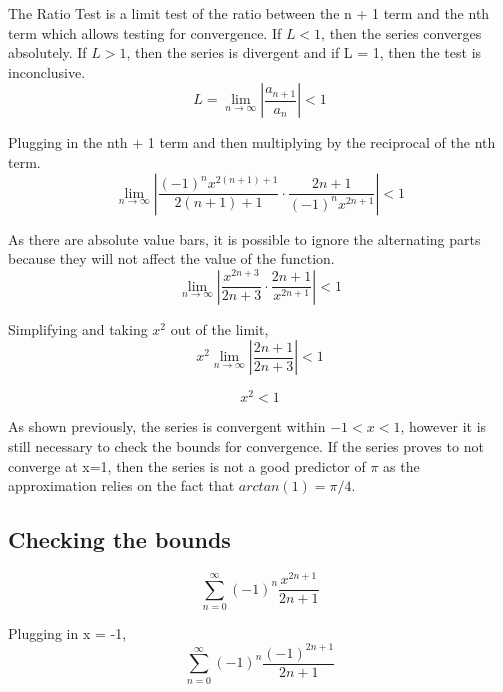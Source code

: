 \documentclass[12pt, titlepage]{article}
\begin{document}
The Ratio Test is a limit test of the ratio between the n + 1 term and the nth term which allows testing for convergence. If \(L < 1\), then the series converges absolutely. If \(L > 1\), then the series is divergent and if L = 1, then the test is inconclusive.
\begin{equation*}
    L = \lim_{n \to \infty} \left |\frac{a_{n+1}}{a_{n}} \right | < 1
\end{equation*}

Plugging in the nth + 1 term and then multiplying by the reciprocal of the nth term.
\begin{equation*}
    \lim_{n \to \infty} \left |\frac{(-1)^{n}x^{2(n+1)+1}}{2(n+1)+1} \cdot \frac{2n+1}{(-1)^{n}x^{2n+1}} \right | < 1
\end{equation*}

As there are absolute value bars, it is possible to ignore the alternating parts because they will not affect the value of the function.
\begin{equation*}
    \lim_{n \to \infty} \left |\frac{x^{2n+3}}{2n+3} \cdot \frac{2n+1}{x^{2n+1}} \right | < 1
\end{equation*}

Simplifying and taking \(x^{2}\) out of the limit,
\begin{equation*}
    x^{2} \lim_{n \to \infty} \left |\frac{2n+1}{2n+3} \right | < 1
\end{equation*}

\begin{equation*}
    x^{2} < 1
\end{equation*}

As shown previously, the series is convergent within \(-1 < x < 1\), however it is still necessary to check the bounds for convergence. If the series proves to not converge at x=1, then the series is not a good predictor of \(\pi\) as the approximation relies on the fact that \(arctan(1) = \pi/4\).

\subsection{Checking the bounds}
\begin{equation*}
    \sum_{n=0}^{\infty} (-1)^{n} \frac{x^{2n+1}}{2n+1}
\end{equation*}

Plugging in x = -1,
\begin{equation*}
    \sum_{n=0}^{\infty} (-1)^{n} \frac{(-1)^{2n+1}}{2n+1}
\end{equation*}
\end{document}
